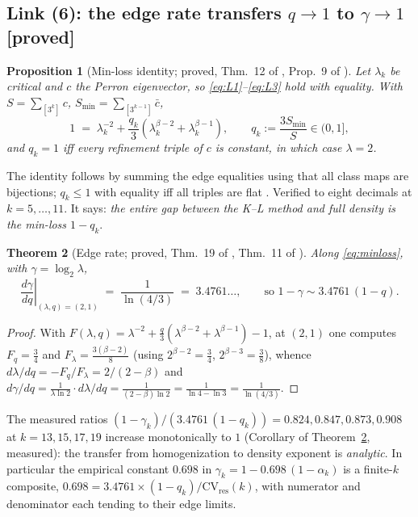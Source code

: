 \documentclass[11pt]{article}
\newtheorem{theorem}{Theorem}
\newtheorem{proposition}[theorem]{Proposition}
\theoremstyle{definition}
\theoremstyle{remark}
\newcommand{\CV}{\mathrm{CV}}
\newcommand{\lam}{\lambda}
\newcommand{\gam}{\gamma}
\newcommand{\bet}{\beta}
\begin{document}
\subsection{Link (6): the edge rate transfers $q \to 1$ to $\gam \to 1$
\textnormal{[proved]}}
\label{sec:link6}

\begin{proposition}[Min-loss identity; proved, Thm.~12 of \cite{NOTE},
Prop.~9 of \cite{Temp26}]\label{prop:minloss}
Let $\lam_k$ be critical and $c$ the Perron eigenvector, so
\eqref{eq:L1}--\eqref{eq:L3} hold with equality. With
$S = \sum_{[3^k]} c$, $S_{\min} = \sum_{[3^{k-1}]} \bar c$,
\begin{equation}
1 \;=\; \lam_k^{-2} + \frac{q_k}{3}\left(\lam_k^{\bet-2} + \lam_k^{\bet-1}\right),
\qquad q_k := \frac{3 S_{\min}}{S} \in (0, 1],
\label{eq:minloss}
\end{equation}
and $q_k = 1$ iff every refinement triple of $c$ is constant, in which case
$\lam = 2$.
\end{proposition}

The identity follows by summing the edge equalities using that all class maps
are bijections; $q_k \leq 1$ with equality iff all triples are flat
\cite{NOTE,Temp26}. Verified to eight decimals at $k = 5, \ldots, 11$. It says:
\emph{the entire gap between the K--L method and full density is the min-loss
$1 - q_k$}.

\begin{theorem}[Edge rate; proved, Thm.~19 of \cite{NOTE}, Thm.~11 of
\cite{Temp26}]\label{thm:edgerate}
Along \eqref{eq:minloss}, with $\gam = \log_2 \lam$,
\[
\left.\frac{d\gam}{dq}\right|_{(\lam, q) = (2, 1)}
\;=\; \frac{1}{\ln(4/3)} \;=\; 3.4761\ldots,
\qquad\text{so } 1 - \gam \sim 3.4761\,(1 - q) .
\]
\end{theorem}

\begin{proof}
With $F(\lam, q) = \lam^{-2} + \tfrac{q}{3}(\lam^{\bet-2} + \lam^{\bet-1}) - 1$,
at $(2, 1)$ one computes $F_q = \tfrac34$ and $F_\lam = \tfrac{3(\bet-2)}{8}$
(using $2^{\bet-2} = \tfrac34$, $2^{\bet-3} = \tfrac38$), whence
$d\lam/dq = -F_q/F_\lam = 2/(2 - \bet)$ and
$d\gam/dq = \tfrac{1}{\lam \ln 2} \cdot d\lam/dq = \tfrac{1}{(2-\bet)\ln 2}
= \tfrac{1}{\ln 4 - \ln 3} = \tfrac{1}{\ln(4/3)}$.
\end{proof}

The measured ratios
$(1 - \gam_k)/(3.4761\,(1 - q_k)) = 0.824, 0.847, 0.873, 0.908$ at
$k = 13, 15, 17, 19$ increase monotonically to $1$ (Corollary of
Theorem~\ref{thm:edgerate}, measured): the transfer from homogenization to
density exponent is \emph{analytic}. In particular the empirical constant
$0.698$ in $\gam_k = 1 - 0.698\,(1 - \alpha_k)$ is a finite-$k$ composite,
$0.698 = 3.4761 \times (1 - q_k)/\CV_{\mathrm{res}}(k)$, with numerator and
denominator each tending to their edge limits.
\end{document}
